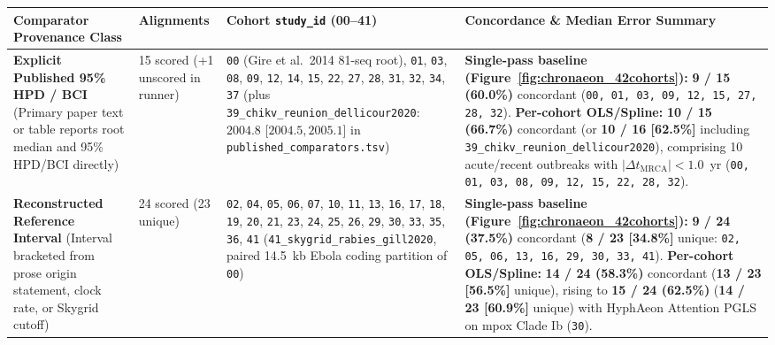 \documentclass[11pt,letterpaper]{article}
\newcommand{\tool}[1]{\textsf{#1}}
\begin{document}
\clearpage

\begin{table}[!htbp]
\centering
\scriptsize
\renewcommand{\arraystretch}{1.05}
\begin{tabularx}{\textwidth}{p{3.1cm}p{1.7cm}p{4.2cm}X}
\toprule
\textbf{Comparator Provenance Class} & \textbf{Alignments} & \textbf{Cohort \texttt{study\_id} (00--41)} & \textbf{Concordance \& Median Error Summary} \\
\midrule
\textbf{Explicit Published 95\% HPD / BCI} \newline (Primary paper text or table reports root median and 95\% HPD/BCI directly) & 15 scored \newline (+1 unscored in runner) &
\texttt{00} (Gire et al.\ 2014 81-seq root), \texttt{01}, \texttt{03}, \texttt{08}, \texttt{09}, \texttt{12}, \texttt{14}, \texttt{15}, \texttt{22}, \texttt{27}, \texttt{28}, \texttt{31}, \texttt{32}, \texttt{34}, \texttt{37} \newline (plus \nolinkurl{39_chikv_reunion_dellicour2020}: $2004.8$ [$2004.5, 2005.1$] in \nolinkurl{published_comparators.tsv}) &
\textbf{Single-pass baseline (Figure~\ref{fig:chronaeon_42cohorts}):} \textbf{9 / 15 (60.0\%)} concordant (\texttt{00, 01, 03, 09, 12, 15, 27, 28, 32}). \newline
\textbf{Per-cohort OLS/Spline:} \textbf{10 / 15 (66.7\%)} concordant (or \textbf{10 / 16 [62.5\%]} including \nolinkurl{39_chikv_reunion_dellicour2020}), comprising 10 acute/recent outbreaks with $|\Delta t_{\mathrm{MRCA}}| < 1.0$~yr (\texttt{00, 01, 03, 08, 09, 12, 15, 22, 28, 32}). \\
\addlinespace
\textbf{Reconstructed Reference Interval} \newline (Interval bracketed from prose origin statement, clock rate, or Skygrid cutoff) & 24 scored \newline (23 unique) &
\texttt{02}, \texttt{04}, \texttt{05}, \texttt{06}, \texttt{07}, \texttt{10}, \texttt{11}, \texttt{13}, \texttt{16}, \texttt{17}, \texttt{18}, \texttt{19}, \texttt{20}, \texttt{21}, \texttt{23}, \texttt{24}, \texttt{25}, \texttt{26}, \texttt{29}, \texttt{30}, \texttt{33}, \texttt{35}, \texttt{36}, \texttt{41} (\nolinkurl{41_skygrid_rabies_gill2020}, paired 14.5~kb Ebola coding partition of \texttt{00}) &
\textbf{Single-pass baseline (Figure~\ref{fig:chronaeon_42cohorts}):} \textbf{9 / 24 (37.5\%)} concordant (\textbf{8 / 23 [34.8\%]} unique: \texttt{02, 05, 06, 13, 16, 29, 30, 33, 41}). \newline
\textbf{Per-cohort OLS/Spline:} \textbf{14 / 24 (58.3\%)} concordant (\textbf{13 / 23 [56.5\%]} unique), rising to \textbf{15 / 24 (62.5\%)} (\textbf{14 / 23 [60.9\%]} unique) with \tool{HyphAeon} Attention PGLS on mpox Clade Ib (\texttt{30}). \\

\end{tabularx}
\end{table}
\end{document}
